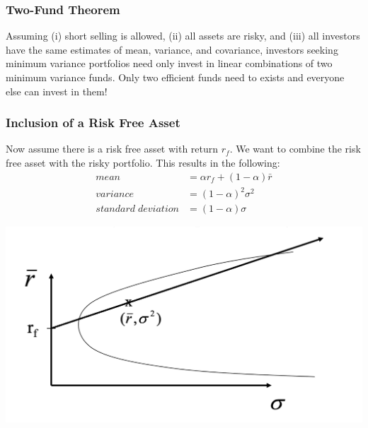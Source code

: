 \documentclass[11pt]{article}
\begin{document}
\subsubsection{Two-Fund Theorem}
Assuming (i) short selling is allowed, (ii) all assets are risky, and (iii) all investors have the same estimates of mean, variance, and covariance, investors seeking minimum variance portfolios need only invest in linear combinations of two minimum variance funds. Only two efficient funds need to exists and everyone else can invest in them!

\subsubsection{Inclusion of a Risk Free Asset}
Now assume there is a risk free asset with return $r_f$.  We want to combine the risk free asset with the risky portfolio.  This results in the following:
\begin{align*}
mean &= \alpha r_f + (1-\alpha) \bar{r} \\
variance &= (1-\alpha)^2 \sigma^2 \\
standard \; deviation & = (1-\alpha) \sigma
\end{align*}
\begin{center}
\includegraphics[scale=0.4]{images/riskfree.png} 
\end{center}
\end{document}
